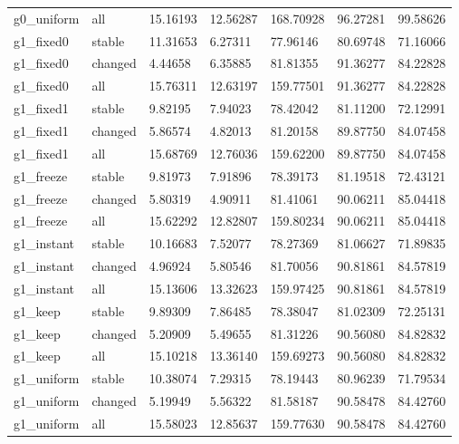 \begin{longtable}{lllllll}
g0\_uniform & all & 15.16193 & 12.56287 & 168.70928 & 96.27281 & 99.58626 \\
g1\_fixed0 & stable & 11.31653 & 6.27311 & 77.96146 & 80.69748 & 71.16066 \\
g1\_fixed0 & changed & 4.44658 & 6.35885 & 81.81355 & 91.36277 & 84.22828 \\
g1\_fixed0 & all & 15.76311 & 12.63197 & 159.77501 & 91.36277 & 84.22828 \\
g1\_fixed1 & stable & 9.82195 & 7.94023 & 78.42042 & 81.11200 & 72.12991 \\
g1\_fixed1 & changed & 5.86574 & 4.82013 & 81.20158 & 89.87750 & 84.07458 \\
g1\_fixed1 & all & 15.68769 & 12.76036 & 159.62200 & 89.87750 & 84.07458 \\
g1\_freeze & stable & 9.81973 & 7.91896 & 78.39173 & 81.19518 & 72.43121 \\
g1\_freeze & changed & 5.80319 & 4.90911 & 81.41061 & 90.06211 & 85.04418 \\
g1\_freeze & all & 15.62292 & 12.82807 & 159.80234 & 90.06211 & 85.04418 \\
g1\_instant & stable & 10.16683 & 7.52077 & 78.27369 & 81.06627 & 71.89835 \\
g1\_instant & changed & 4.96924 & 5.80546 & 81.70056 & 90.81861 & 84.57819 \\
g1\_instant & all & 15.13606 & 13.32623 & 159.97425 & 90.81861 & 84.57819 \\
g1\_keep & stable & 9.89309 & 7.86485 & 78.38047 & 81.02309 & 72.25131 \\
g1\_keep & changed & 5.20909 & 5.49655 & 81.31226 & 90.56080 & 84.82832 \\
g1\_keep & all & 15.10218 & 13.36140 & 159.69273 & 90.56080 & 84.82832 \\
g1\_uniform & stable & 10.38074 & 7.29315 & 78.19443 & 80.96239 & 71.79534 \\
g1\_uniform & changed & 5.19949 & 5.56322 & 81.58187 & 90.58478 & 84.42760 \\
g1\_uniform & all & 15.58023 & 12.85637 & 159.77630 & 90.58478 & 84.42760 \\
\bottomrule
\end{longtable}
